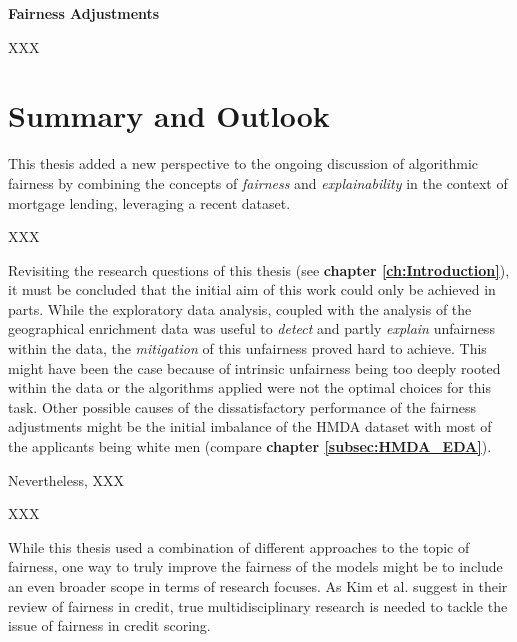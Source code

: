 \textbf{Fairness Adjustments}


XXX




\section{Summary and Outlook}\label{sec:summary}


This thesis added a new perspective to the ongoing discussion of algorithmic fairness by combining the concepts of \textit{fairness} and \textit{explainability} in the context of mortgage lending, leveraging a recent dataset.

XXX

Revisiting the research questions of this thesis (see \textbf{chapter \ref{ch:Introduction}}), it must be concluded that the initial aim of this work could only be achieved in parts. 
While the exploratory data analysis, coupled with the analysis of the geographical enrichment data was useful to \textit{detect} and partly \textit{explain} unfairness within the data, the \textit{mitigation} of this unfairness proved hard to achieve. 
This might have been the case because of intrinsic unfairness being too deeply rooted within the data or the algorithms applied were not the optimal choices for this task.
Other possible causes of the dissatisfactory performance of the fairness adjustments might be the initial imbalance of the HMDA dataset with most of the applicants being white men (compare \textbf{chapter \ref{subsec:HMDA_EDA}}).

Nevertheless, XXX


XXX

While this thesis used a combination of different approaches to the topic of fairness, one way to truly improve the fairness of the models might be to include an even broader scope in terms of research focuses.
As Kim et al. \parencite{Kim2023} suggest in their review of fairness in credit, true multidisciplinary research is needed to tackle the issue of fairness in credit scoring.